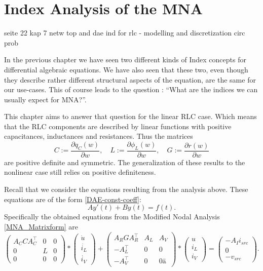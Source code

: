 \chapter{Index Analysis of the MNA}

seite 22 kap 7 netw top and dae ind for rlc - modelling and discretization circ prob

In the previous chapter we have seen two different kinds of Index concepts for differential algebraic equations. We have also seen that these two, even though they describe rather different structural aspects of the equation, are the same for our use-cases. This of course leads to the question : ``What are the indices we can usually expect for MNA?''.

This chapter aims to answer that question for the linear RLC case. Which means that the RLC components are described by linear functions with positive capacitances, inductances and resistances. Thus the matrices
\begin{displaymath}
	C:=\frac{\partial q_C(w)}{\partial w}, \quad L:=\frac{\partial \phi_L(w)}{\partial w}, \quad G:=\frac{\partial r(w)}{\partial w}
\end{displaymath}
are positive definite and symmetric. The generalization of these results to the nonlinear case still relies on positive definiteness.

Recall that we consider the equations resulting from the analysis above. These equations are of the form \ref{DAE-const-coeff}:
\begin{displaymath}
	A y'(t) + B y(t) = f(t).
\end{displaymath}
Specifically the obtained equations from the Modified Nodal Analysis \ref{MNA_Matrixform} are
\begin{displaymath}
	\begin{pmatrix}
		A_C C A_C^\top & 0 & 0 \\
		0 & L & 0 \\
		0 & 0 & 0
	\end{pmatrix}
	*
	\begin{pmatrix}
		\dot{u} \\
		\dot{i_L} \\
		\dot{i_V}
	\end{pmatrix}
	+
	\begin{pmatrix}
		A_R G A_R^\top & A_L & A_V \\
		-A_L^\top & 0 & 0 \\
		-A_V^\top & 0 & 0 ä
	\end{pmatrix}
	*
	\begin{pmatrix}
		u \\
		i_L \\
		i_V
	\end{pmatrix}
	=
	\begin{pmatrix}
		-A_I i_{src} \\
		0 \\
		-v_{src}
	\end{pmatrix}.
\end{displaymath}

